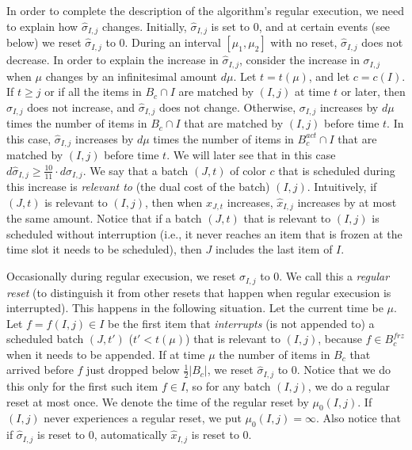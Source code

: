 \documentclass[12pt]{article}
\begin{document}
In order to complete the description of the algorithm's regular
execution, we need to explain how $\hat{\sigma}_{I,j}$ changes.
Initially, $\hat{\sigma}_{I,j}$ is set to $0$, and at certain events
(see below) we reset $\hat{\sigma}_{I,j}$ to $0$. During an interval 
$[\mu_1,\mu_2]$ with no reset, $\hat{\sigma}_{I,j}$ does not
decrease. In order to explain the increase in $\hat{\sigma}_{I,j}$,
consider the increase in $\sigma_{I,j}$ when $\mu$ changes by
an infinitesimal amount $d\mu$. Let $t = t(\mu)$, and let
$c = c(I)$. If $t \ge j$ or
if all the items in $B_c\cap I$ are matched by $(I,j)$ at time $t$
or later, then $\sigma_{I,j}$ does not increase, and $\hat{\sigma}_{I,j}$
does not change. Otherwise, $\sigma_{I,j}$ increases by $d\mu$
times the number of items in $B_c\cap I$ that are matched by
$(I,j)$ before time $t$. In this case, $\hat{\sigma}_{I,j}$ increases
by $d\mu$ times the number of items in $B_c^{act}\cap I$ that
are matched by $(I,j)$ before time $t$. We will later see that
in this case $d\hat{\sigma}_{I,j}\ge\frac{10}{11}\cdot d\sigma_{I,j}$.
We say that a batch $(J,t)$ of color $c$ that is scheduled during this 
increase is {\em relevant to} (the dual cost of the batch) $(I,j)$.
Intuitively, if $(J,t)$ is relevant to $(I,j)$, then when $x_{J,t}$ increases,
$\hat{x}_{I,j}$ increases by at most the same amount. Notice that
if a batch $(J,t)$ that is relevant to $(I,j)$ is scheduled without
interruption (i.e., it never reaches an item that is frozen at the
time slot it needs to be scheduled), then $J$ includes the last
item of $I$.

Occasionally during regular execusion, we reset $\hat{\sigma}_{I,j}$ 
to $0$. We call this a {\em regular reset} (to distinguish it from
other resets that happen when regular execusion is interrupted).
This happens in the following situation. Let the current time 
be $\mu$. Let $f = f(I,j)\in I$ be the first item that {\em interrupts}
(is not appended to) a scheduled batch $(J,t')$ ($t' < t(\mu)$)
that is relevant to $(I,j)$, because $f\in B_c^{frz}$ when
it needs to be appended. If at time $\mu$ the number of
items in $B_c$ that arrived before $f$ just dropped below
$\frac 1 2 |B_c|$, we reset $\hat{\sigma}_{I,j}$ to $0$. Notice 
that we do this only for the first such item $f\in I$, so for
any batch $(I,j)$, we do a regular reset at most once.
We denote the time of the regular reset by $\mu_0(I,j)$. 
If $(I,j)$ never experiences a regular reset, we put 
$\mu_0(I,j) = \infty$.
Also notice that if $\hat{\sigma}_{I,j}$ is reset to $0$, 
automatically $\hat{x}_{I,j}$ is reset to $0$.
\end{document}
